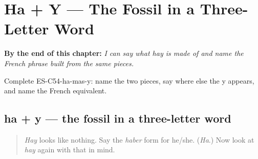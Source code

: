 
\chapter{Ha + Y --- The Fossil in a Three-Letter Word}
\label{ch:hay-etymology}

\begin{chapteropening}
\textbf{By the end of this chapter:} \emph{I can say what hay is made of and name the French phrase built from the same pieces.}

Complete ES-C54-ha-mas-y: name the two pieces, say where else the y appears, and name the French equivalent.
\end{chapteropening}

\section[ha + y]{ha + y — the fossil in a three-letter word}

\label{lesson:ES-C54-ha-mas-y}



\begin{quote}
\emph{Hay} looks like nothing. Say the \emph{haber} form for he/she. (\emph{Ha}.) Now look at \emph{hay} again with that in mind.
\end{quote}

